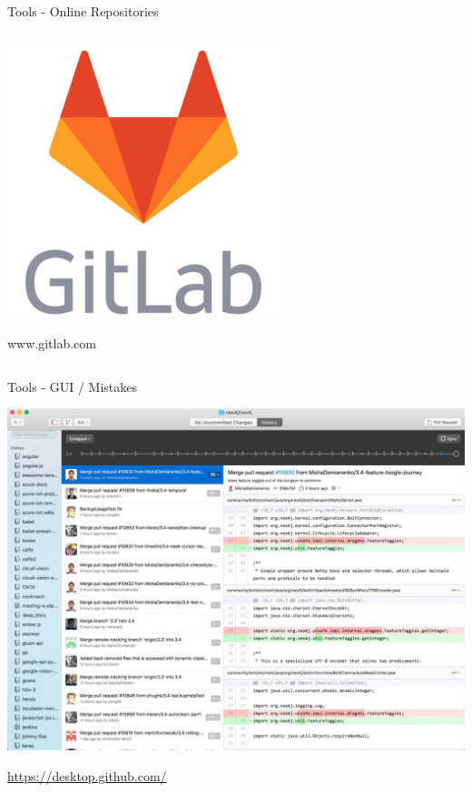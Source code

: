 \documentclass[table,svgnames,aspectratio=169]{beamer}
\begin{document}
\begin{frame}[label={sec:orgfcaecc0}]{Tools - Online Repositories}
\begin{columns}
\begin{column}{.33\columnwidth}
\begin{center}
\includegraphics[width=.9\linewidth]{graphics/gitlab.png}
\end{center}
\begin{center}
www.gitlab.com
\end{center}
\end{column}
\end{columns}
\end{frame}


\begin{frame}[label={sec:org6acf1e8}]{Tools - GUI / Mistakes}
\begin{center}
\includegraphics[width=.5\textwidth]{graphics/github_desktop.jpg}
\end{center}

\begin{center}
\url{https://desktop.github.com/}
\end{center}
\end{frame}
\end{document}
